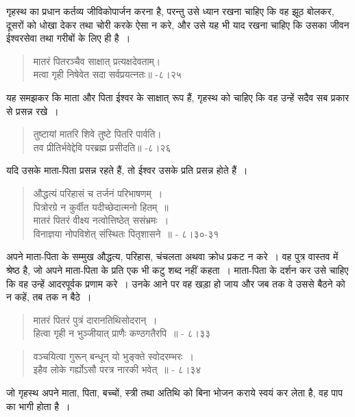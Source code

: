 गृहस्थ का प्रधान कर्तव्य जीविकोपार्जन करना है, परन्तु उसे ध्यान रखना चाहिए कि वह झूठ बोलकर, दूसरों को धोखा देकर तथा चोरी करके ऐसा न करे, और उसे यह भी याद रखना चाहिए कि उसका जीवन ईश्वरसेवा तथा गरीबों के लिए ही है~।

\begin{verse}
मातरं पितरञ्चैव साक्षात् प्रत्यक्षदेवताम्।\\ मत्वा गृही निषेवेत सदा सर्वप्रयत्नतः॥ -८।२५
\end{verse}

यह समझकर कि माता और पिता ईश्वर के साक्षात् रूप हैं, गृहस्थ को चाहिए कि वह उन्हें सदैव सब प्रकार से प्रसन्न रखे~।

\begin{verse}
तुष्टायां मातरि शिवे तुष्टे पितरि पार्वति।\\ तव प्रीतिर्भवेद्देवि परब्रह्म प्रसीदति॥ -८।२६
\end{verse}

यदि उसके माता-पिता प्रसन्न रहते हैं, तो ईश्वर उसके प्रति प्रसन्न होते हैं~।

\begin{verse}
औद्धत्यं परिहासं च तर्जनं परिभाषणम्~।\\ पित्रोरग्रे न कुर्वीत यदीच्छेदात्मनो हितम्~॥\\ मातरं पितरं वीक्ष्य नत्वोत्तिष्ठेत् ससंभ्रमः~।\\ विनाज्ञया नोपविशेत् संस्थितः पितृशासने~॥ - ८।३०-३१
\end{verse}

अपने माता-पिता के सम्मुख औद्धत्य, परिहास, चंचलता अथवा क्रोध प्रकट न करे~। वह पुत्र वास्तव में श्रेष्ठ है, जो अपने माता-पिता के प्रति एक भी कटु शब्द नहीं कहता~। माता-पिता के दर्शन कर उसे चाहिए कि वह उन्हें आदरपूर्वक प्रणाम करे~। उनके आने पर वह खड़ा हो जाय और जब तक वे उससे बैठने को न कहें, तब तक न बैठे~।

\begin{verse}
मातरं पितरं पुत्रं दारानतिथिसोदरान्~।\\ हित्वा गृही न भुञ्जीयात् प्राणैः कण्ठगतैरपि~॥ - ८।३३
\end{verse}

\begin{verse}
वञ्चयित्वा गुरून् बन्धून् यो भुङ्क्ते स्वोदरम्भरः~।\\ इहैव लोके गर्ह्योऽसौ परत्र नारकी भवेत्~॥ - ८।३४
\end{verse}

जो गृहस्थ अपने माता, पिता, बच्चों, स्त्री तथा अतिथि को बिना भोजन कराये स्वयं कर लेता है, वह पाप का भागी होता है~।

